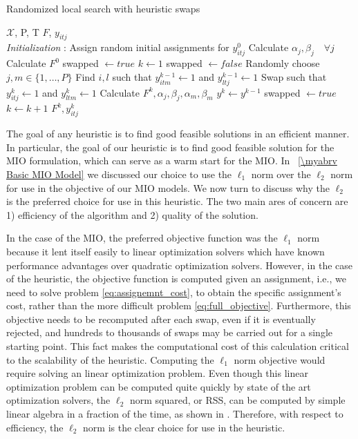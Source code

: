 \begin{algorithm}
 \caption{Randomized local search with heuristic swaps}
 \label{alg:Basic_Heuristic}
 \begin{algorithmic}[1]
  \renewcommand{\algorithmicrequire}{\textbf{Input:}}
  \renewcommand{\algorithmicensure}{\textbf{Output:}}
 \REQUIRE $\boldsymbol{\mathcal{X}}$, P, T
 \ENSURE  $F$, $y_{itj}$
 \\ \textit{Initialization} : Assign random initial assignments for $y^{0}_{itj}$
  \STATE Calculate $\alpha_{j}, \beta_{j} \quad \forall j $
  \STATE Calculate $F^{0}$
  \STATE swapped $\leftarrow true$
  \STATE $k\leftarrow1$
  \STATE swapped $\leftarrow false$
  \STATE Randomly choose $j,m\in\{1,\ldots,P\}$
  \STATE Find $i,l$ such that $y^{k-1}_{itm}\leftarrow1$ and $y^{k-1}_{ltj}\leftarrow1$
  \STATE Swap such that $y^{k}_{itj}\leftarrow1$ and $y^{k}_{ltm}\leftarrow1$
  \STATE Calculate $F^{k}, \alpha_{j}, \beta_{j}, \alpha_{m}, \beta_{m}$
  \STATE $y^{k} \leftarrow y^{k-1}$
  \ELSE 
  \STATE swapped $\leftarrow true$
  \ENDIF
  \ENDFOR
  \STATE $ k \leftarrow k + 1 $
  \ENDWHILE
 \RETURN $F^{k}, y^{k}_{itj}$ 
 \end{algorithmic} 
 \end{algorithm}

The goal of any heuristic is to find good feasible solutions in an efficient manner. In particular, the goal of our heuristic is to find good feasible solution for the MIO formulation, which can serve as a warm start for the MIO. In \mysection~\ref{\myabrv Basic MIO Model} we discussed our choice to use the $\ell_1$ norm over the $\ell_2$ norm for use in the objective of our MIO models. We now turn to discuss why the $\ell_2$ is the preferred choice for use in this heuristic. The two main ares of concern are 1) efficiency of the algorithm and 2) quality of the solution.

 In the case of the MIO, the preferred objective function was the  $\ell_1$ norm because it lent itself easily to linear optimization solvers which have known performance advantages over quadratic optimization solvers. However, in the case of the heuristic, the objective function is computed given an assignment, i.e., we need to solve problem \eqref{eq:assignemnt_cost}, to obtain the specific assignment's cost, rather than the more difficult problem \eqref{eq:full_objective}. Furthermore, this objective needs to be recomputed after each swap, even if it is eventually rejected, and hundreds to thousands of swaps may be carried out for a single starting point. This fact makes the computational cost of this calculation critical to the scalability of the heuristic.  Computing the $\ell_1$ norm objective would require solving an linear optimization problem. Even though this linear optimization problem can be computed quite quickly by state of the art optimization solvers, the $\ell_2$ norm squared, or RSS, can be computed by simple linear algebra in a fraction of the time, as shown in \cite{RSS-Matrix}. Therefore, with respect to efficiency, the $\ell_2$ norm is the clear choice for use in the heuristic.

